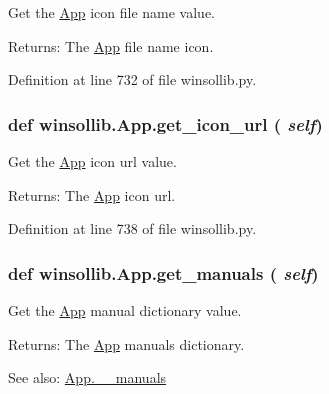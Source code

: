 Get the \hyperlink{classwinsollib_1_1App}{App} icon file name value. 

\begin{Desc}
\item[Returns:]The \hyperlink{classwinsollib_1_1App}{App} file name icon. \end{Desc}


Definition at line 732 of file winsollib.py.\hypertarget{classwinsollib_1_1App_b413c05e7b685dc3c2ba6c90f47586b6}{
\subsubsection[get\_\-icon\_\-url]{\setlength{\rightskip}{0pt plus 5cm}def winsollib.App.get\_\-icon\_\-url ( {\em self})}}
\label{classwinsollib_1_1App_b413c05e7b685dc3c2ba6c90f47586b6}


Get the \hyperlink{classwinsollib_1_1App}{App} icon url value. 

\begin{Desc}
\item[Returns:]The \hyperlink{classwinsollib_1_1App}{App} icon url. \end{Desc}


Definition at line 738 of file winsollib.py.\hypertarget{classwinsollib_1_1App_fc82d66adfb3400eecd4395c455353d8}{
\subsubsection[get\_\-manuals]{\setlength{\rightskip}{0pt plus 5cm}def winsollib.App.get\_\-manuals ( {\em self})}}
\label{classwinsollib_1_1App_fc82d66adfb3400eecd4395c455353d8}


Get the \hyperlink{classwinsollib_1_1App}{App} manual dictionary value. 

\begin{Desc}
\item[Returns:]The \hyperlink{classwinsollib_1_1App}{App} manuals dictionary.\end{Desc}
\begin{Desc}
\item[See also:]\hyperlink{classwinsollib_1_1App_1af4cfd72ef4f2e4ce69304a2aa34b5f}{App.\_\-\_\-manuals} \end{Desc}


